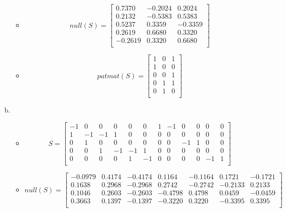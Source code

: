 \documentclass[a4paper, 10pt]{article}
\begin{document}
\begin{enumerate}[a)]
\begin{itemize}
          \item \[ null(S) = 
            \begin{bmatrix}
              0.7370 & -0.2024 &  0.2024 \\
              0.2132 & -0.5383 &  0.5383 \\
              0.5237 &  0.3359 & -0.3359 \\
              0.2619 &  0.6680 &  0.3320 \\
             -0.2619 &  0.3320 &  0.6680 \\
            \end{bmatrix} \]
          \item \[ patmat(S) =
            \begin{bmatrix}
            1 & 0 & 1 \\
            1 & 0 & 0 \\
            0 & 0 & 1 \\
            0 & 1 & 1 \\
            0 & 1 & 0 \\
            \end{bmatrix} \]
        \end{itemize}
  \item \begin{itemize}
          \item \[ S =
            \begin{bmatrix}
            -1 & 0  & 0  & 0  & 0  & 0  & 1 & -1 & 0  & 0 & 0  & 0 \\
            1  & -1 & -1 & 1  & 0  & 0  & 0 & 0  & 0  & 0 & 0  & 0 \\
            0  & 1  & 0  & 0  & 0  & 0  & 0 & 0  & -1 & 1 & 0  & 0 \\
            0  & 0  & 1  & -1 & -1 & 1  & 0 & 0  & 0  & 0 & 0  & 0 \\
            0  & 0  & 0  & 0  & 1  & -1 & 0 & 0  & 0  & 0 & -1 & 1 \\
            \end{bmatrix} \]
          \item \[ null(S) = 
            \begin{bmatrix}
            -0.0979 &  0.4174 & -0.4174 &  0.1164 & -0.1164 &  0.1721 & -0.1721 \\
             0.1638 &  0.2968 & -0.2968 &  0.2742 & -0.2742 & -0.2133 &  0.2133 \\
             0.1046 &  0.2603 & -0.2603 & -0.4798 &  0.4798 &  0.0459 & -0.0459 \\
             0.3663 &  0.1397 & -0.1397 & -0.3220 &  0.3220 & -0.3395 &  0.3395 \\

\end{bmatrix}\]
\end{itemize}
\end{enumerate}
\end{document}
